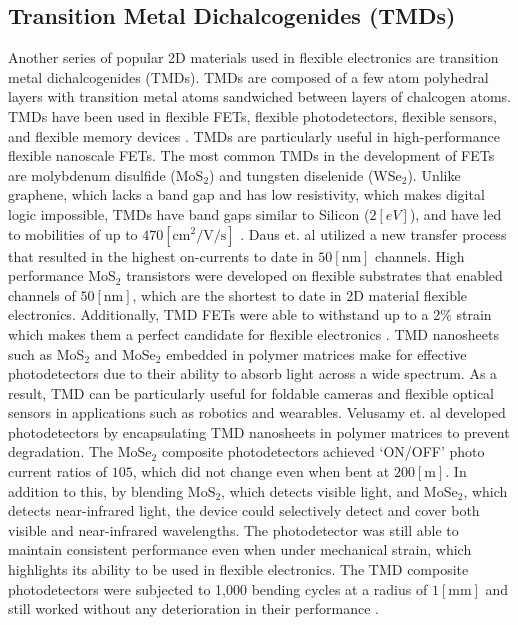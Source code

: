 \documentclass[conference]{IEEEtran}
\begin{document}
\subsection{Transition Metal Dichalcogenides (TMDs)}

Another series of popular 2D materials used in flexible electronics are transition metal dichalcogenides (TMDs). TMDs are composed of a few atom polyhedral layers with transition metal atoms sandwiched between layers of chalcogen atoms. TMDs have been used in flexible FETs, flexible photodetectors, flexible sensors, and flexible memory devices \cite{tc1}. TMDs are particularly useful in high-performance flexible nanoscale FETs. The most common TMDs in the development of FETs are molybdenum disulfide (MoS$_2$) and tungsten diselenide (WSe$_2$). Unlike graphene, which lacks a band gap and has low resistivity, which  makes digital logic impossible, TMDs have band gaps similar to Silicon ($2[\si{eV}]$), and have led to mobilities of up to $470[\si{\centi\meter\squared\per\volt\per\second}]$ \cite{tc8}. Daus et. al \cite{tc8} utilized a new transfer process that resulted in the highest on-currents to date in $50[\si{\nano\meter}]$ channels. High performance MoS$_2$ transistors were developed on flexible substrates that enabled channels of $50[\si{\nano\meter}]$, which are the shortest to date in 2D material flexible electronics. Additionally, TMD FETs were able to withstand up to a 2\% strain which makes them a perfect candidate for flexible electronics \cite{tc8}. TMD nanosheets such as MoS$_2$ and MoSe$_2$ embedded in polymer matrices make for effective photodetectors due to their ability to absorb light across a wide spectrum. As a result, TMD can be particularly useful for foldable cameras and flexible optical sensors in applications such as robotics and wearables.  Velusamy et. al \cite{tc9} developed photodetectors by encapsulating TMD nanosheets in polymer matrices to prevent degradation. The MoSe$_2$ composite photodetectors achieved `\textsc{ON/OFF}' photo current ratios of $105$, which did not change even when bent at $200[\si{\meter}]$. In addition to this, by blending MoS$_2$, which detects visible light, and MoSe$_2$, which detects near-infrared light, the device could selectively detect and cover both visible and near-infrared wavelengths. The photodetector was still able to maintain consistent performance even when under mechanical strain, which highlights its ability to be used in flexible electronics. The TMD composite photodetectors were subjected to 1,000 bending cycles at a radius of $1[\si{\milli\meter}]$ and still worked without any deterioration in their performance \cite{tc9}.
\end{document}
